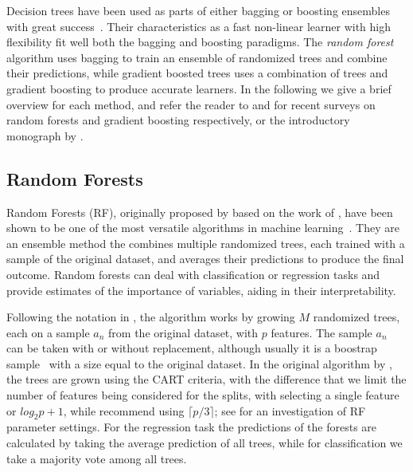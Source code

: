 Decision trees have been used as parts of either bagging
or boosting ensembles with great success~\cite{hundreds-classifiers}. Their characteristics as a fast
non-linear learner
with high flexibility fit well both the bagging and boosting paradigms.
The \emph{random forest} algorithm uses bagging to train an ensemble
of randomized trees and combine their predictions, while gradient boosted trees
uses a combination of trees and gradient boosting to produce
accurate learners. In the following we give a brief overview for each method,
and refer the reader to \cite{random-forest-survey, tree-survey} and \cite{biau-optimization} for recent surveys on
random forests and gradient boosting respectively, or the introductory monograph by \citet{esl}.

\subsection{Random Forests}
\label{sec:bg-dt-random-forests}

Random Forests (RF), originally proposed by \citet{random-forests} based on the work
of \citet{amit-rf}, have been shown to be one of the
most versatile algorithms in machine learning~\cite{hundreds-classifiers}. They are an
ensemble method the combines multiple randomized trees, each trained with a sample
of the original dataset, and averages their predictions to produce the final outcome.
Random forests can deal with classification or regression tasks and provide estimates
of the importance of variables, aiding in their interpretability.

Following the notation in \cite{random-forest-survey}, the algorithm works by growing
$M$ randomized trees, each on a sample $a_n$ from the original dataset, with $p$ features.
The sample
$a_n$ can be taken with or without replacement, although usually it is a boostrap
sample~\cite{bootstrap} with a size equal to the original dataset. In the original
algorithm by \citeauthor{random-forests}, the trees are grown using the CART criteria,
with the difference that we limit the number of features being
considered for the splits, with \citeauthor{random-forests} selecting a single feature or
$log_2{p} + 1$, while \citeauthor{random-forest-survey} recommend using $\lceil p/3 \rceil$;
see \cite{rf-parameters} for an investigation of RF parameter settings.
For the regression task the predictions of the forests are calculated
by taking the average prediction of all trees, while for classification
we take a majority vote among all trees.

